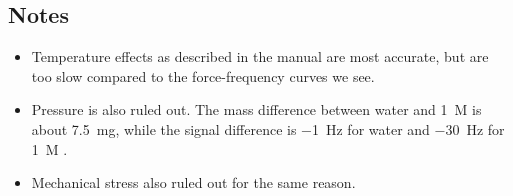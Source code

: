 \subsection*{Notes}
\begin{itemize}
\item Temperature effects as described in the manual are most accurate,
but are too slow compared to the force-frequency curves we see.
\item Pressure is also ruled out. The mass difference between water and
\SI{1}{M}  is about \SI{7.5}{\milli\gram}, while the signal
difference is \SI{-1}{\hertz} for water and \SI{-30}{\hertz} for
\SI{1}{M} .
\item Mechanical stress also ruled out for the same reason.
\end{itemize}



